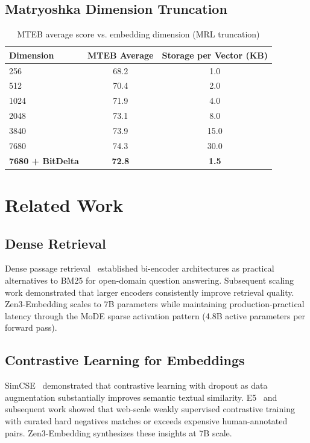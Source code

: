 \documentclass[11pt,a4paper]{article}
\begin{document}
\subsection{Matryoshka Dimension Truncation}

\begin{table}[H]
\centering
\caption{MTEB average score vs. embedding dimension (MRL truncation)}
\begin{tabular}{lcc}
\toprule
\textbf{Dimension} & \textbf{MTEB Average} & \textbf{Storage per Vector (KB)} \\
\midrule
256   & 68.2 & 1.0  \\
512   & 70.4 & 2.0  \\
1024  & 71.9 & 4.0  \\
2048  & 73.1 & 8.0  \\
3840  & 73.9 & 15.0 \\
7680  & 74.3 & 30.0 \\
\textbf{7680 + BitDelta} & \textbf{72.8} & \textbf{1.5} \\
\bottomrule
\end{tabular}
\label{tab:matryoshka}
\end{table}

\section{Related Work}
\label{sec:related}

\subsection{Dense Retrieval}

Dense passage retrieval~\cite{karpukhin2020dense} established bi-encoder architectures
as practical alternatives to BM25 for open-domain question answering. Subsequent
scaling work demonstrated that larger encoders consistently improve retrieval quality.
Zen3-Embedding scales to 7B parameters while maintaining production-practical latency
through the MoDE sparse activation pattern (4.8B active parameters per forward pass).

\subsection{Contrastive Learning for Embeddings}

SimCSE~\cite{gao2021simcse} demonstrated that contrastive learning with dropout as
data augmentation substantially improves semantic textual similarity. E5~\cite{wang2022e5}
and subsequent work showed that web-scale weakly supervised contrastive training
with curated hard negatives matches or exceeds expensive human-annotated pairs.
Zen3-Embedding synthesizes these insights at 7B scale.
\end{document}
